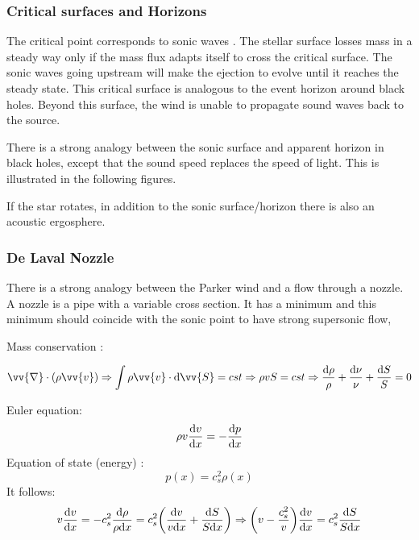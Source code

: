 \documentclass[10pt,a4paper,english,draft]{article}
\let\originalleft\left
\let\originalright\right
\renewcommand{\left}{\mathopen{}\mathclose\bgroup\originalleft}
\renewcommand{\right}{\aftergroup\egroup\originalright}
\begin{document}
\subsubsection{Critical surfaces and Horizons}

The critical point corresponds to sonic waves . The stellar surface losses mass in a steady
way only if the mass flux  adapts itself to cross the critical surface. The sonic waves going
upstream will make the ejection to evolve until it reaches the steady state. This critical surface
is analogous to the event horizon around black holes. Beyond this surface, the wind is unable
to propagate sound waves back to the source.

There is a strong analogy between the sonic surface and apparent horizon in black holes,
except that the sound speed  replaces the speed of light. This is illustrated in the following
figures.


If the star rotates, in addition to the sonic surface/horizon there is also an acoustic ergosphere.


\subsubsection{De Laval Nozzle}

There is a strong analogy between the Parker wind and a flow through a nozzle. A nozzle is a
pipe with a variable cross section. It has a minimum and this minimum should coincide with the
sonic point to have strong supersonic flow,


Mass conservation :

\begin{equation}
  \vv{\nabla}\cdot(\rho\vv{v}) \Rightarrow \int \rho\vv{v}\cdot \d \vv{S} = cst \Rightarrow \rho vS = cst
  \Rightarrow \frac{\d \rho}{\rho} + \frac{\d \nu}{\nu} + \frac{\d S}{S} = 0
\end{equation}

Euler equation:
 \begin{equation}
  \rho v \frac{\mathrm{d} v}{\mathrm{d} x} = -\frac{\mathrm{d} p}{\mathrm{d} x}
\end{equation}
Equation of state (energy) :
\begin{equation}
  p(x) = c_{s}^2\rho(x)
\end{equation}
 It follows:
\begin{equation}
  v\frac{\d v}{\d x} = -c_s^2\frac{\d\rho}{\rho \d x} = c_s^2\left(\frac{\d v}{v\d x}+\frac{\d S}{S\d x}\right)
  \Rightarrow \left( v - \frac{c_s^2}{v} \right)\frac{\d v}{\d x} = c_s^2\frac{\d S}{S \d x}
\end{equation}
\end{document}

